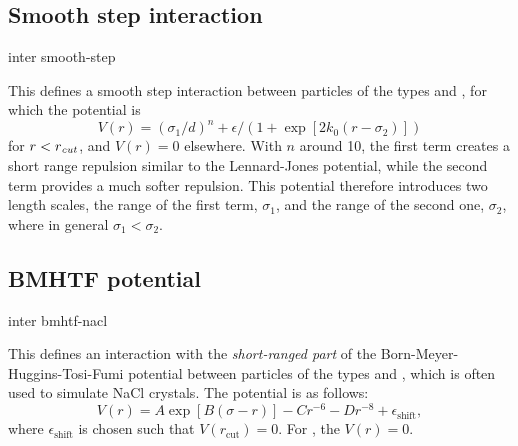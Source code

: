 \subsection{Smooth step interaction}
\begin{essyntax}
  inter  
  smooth-step   \var{$\epsilon$} 
   
  \begin{features}
  \end{features}
\end{essyntax}
This defines a smooth step interaction between particles of the
types  and , for which the potential is
\begin{equation}
  V(r)= \left(\sigma_1/d\right)^n + \epsilon/(1 + \exp\left[2k_0 (r - \sigma_2)\right])
\end{equation}
for $r<r_\text{\mbox{\textrm{\textit{cut}}}}$, and $V(r)=0$ elsewhere. With $n$ around 10, the
first term creates a short range repulsion similar to the Lennard-Jones
potential, while the second term provides a much softer repulsion. This
potential therefore introduces two length scales, the range of the first term,
$\sigma_1$, and the range of the second one, $\sigma_2$, where in general
$\sigma_1<\sigma_2$.

\subsection{BMHTF potential}
\begin{essyntax}
  inter  
  bmhtf-nacl     \var{$\sigma$} 
  \begin{features}
  \end{features}
\end{essyntax}
This defines an interaction with the {\em short-ranged part} of the
Born-Meyer-Huggins-Tosi-Fumi potential between particles of the types
 and , which is often used to simulate NaCl crystals. The
potential is as follows:
\begin{equation}
  V(r)= A\exp\left[B(\sigma - r)\right] -
  C r^{-6} - D r^{-8} + \epsilon_\text{shift},
\end{equation}
where $\epsilon_\text{shift}$ is chosen such that $V(r_\text{cut})=0$. For
, the $V(r)=0$.

